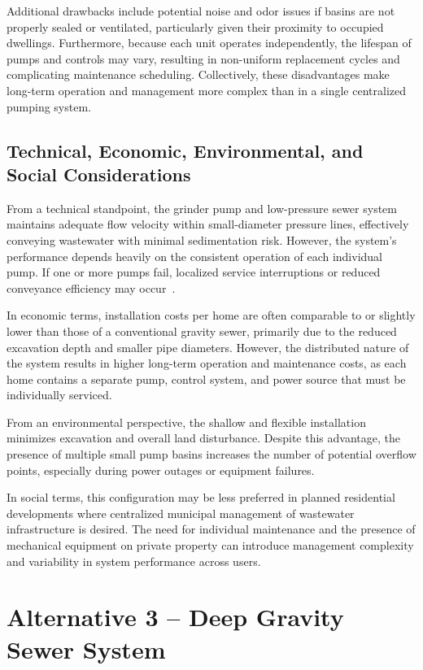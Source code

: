 Additional drawbacks include potential noise and odor issues if basins are not properly sealed or ventilated, particularly given their proximity to occupied dwellings. Furthermore, because each unit operates independently, the lifespan of pumps and controls may vary, resulting in non-uniform replacement cycles and complicating maintenance scheduling. Collectively, these disadvantages make long-term operation and management more complex than in a single centralized pumping system.

\subsection{Technical, Economic, Environmental, and Social Considerations}

From a technical standpoint, the grinder pump and low-pressure sewer system maintains adequate flow velocity within small-diameter pressure lines, effectively conveying wastewater with minimal sedimentation risk. However, the system’s performance depends heavily on the consistent operation of each individual pump. If one or more pumps fail, localized service interruptions or reduced conveyance efficiency may occur~\cite{EPA_LiftStation_DesignManual_2004}.

In economic terms, installation costs per home are often comparable to or slightly lower than those of a conventional gravity sewer, primarily due to the reduced excavation depth and smaller pipe diameters. However, the distributed nature of the system results in higher long-term operation and maintenance costs, as each home contains a separate pump, control system, and power source that must be individually serviced.

From an environmental perspective, the shallow and flexible installation minimizes excavation and overall land disturbance. Despite this advantage, the presence of multiple small pump basins increases the number of potential overflow points, especially during power outages or equipment failures.

In social terms, this configuration may be less preferred in planned residential developments where centralized municipal management of wastewater infrastructure is desired. The need for individual maintenance and the presence of mechanical equipment on private property can introduce management complexity and variability in system performance across users.

\section{Alternative 3 – Deep Gravity Sewer System}\label{sec:alt3}

